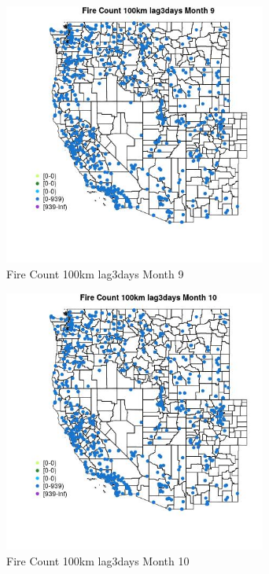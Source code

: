 \begin{figure} 
\centering  
\includegraphics[width=0.77\textwidth]{Code_Outputs/Report_ML_input_PM25_Step4_part_e_de_duplicated_aves_compiled_2019-05-21wNAs_MapObsMo9Fire_Count_100km_lag3days.jpg} 
\caption{\label{fig:Report_ML_input_PM25_Step4_part_e_de_duplicated_aves_compiled_2019-05-21wNAsMapObsMo9Fire_Count_100km_lag3days}Fire Count 100km lag3days Month 9} 
\end{figure} 
 

\clearpage 

\begin{figure} 
\centering  
\includegraphics[width=0.77\textwidth]{Code_Outputs/Report_ML_input_PM25_Step4_part_e_de_duplicated_aves_compiled_2019-05-21wNAs_MapObsMo10Fire_Count_100km_lag3days.jpg} 
\caption{\label{fig:Report_ML_input_PM25_Step4_part_e_de_duplicated_aves_compiled_2019-05-21wNAsMapObsMo10Fire_Count_100km_lag3days}Fire Count 100km lag3days Month 10} 
\end{figure} 
 

